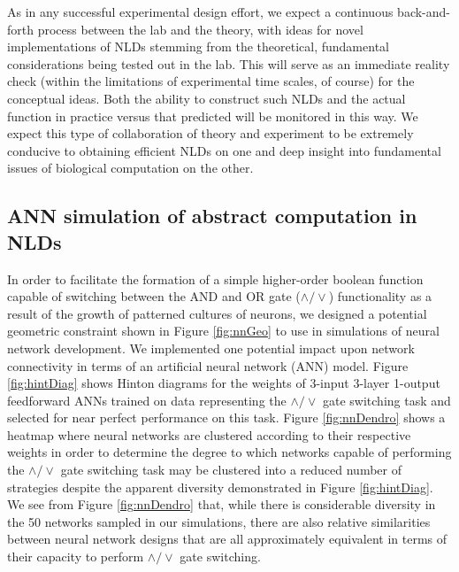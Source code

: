 As in any successful experimental design effort, we expect a continuous back-and-forth process between the lab and the theory, with ideas for novel implementations of NLDs stemming from the theoretical, fundamental considerations being tested out in the lab. This will serve as an immediate reality check (within the limitations of experimental time scales, of course) for the conceptual ideas. Both the ability to construct such NLDs and the actual function in practice versus that predicted will be monitored in this way. We expect this type of collaboration of theory and experiment to be extremely conducive to obtaining efficient NLDs on one and deep insight into fundamental issues of biological computation on the other. 


\subsection{ANN simulation of abstract computation in NLDs}
In order to facilitate the formation of a simple higher-order boolean function capable of switching between the AND and OR gate ($\wedge / \vee$) functionality as a result of the growth of patterned cultures of neurons, we designed a potential geometric constraint shown in Figure \ref{fig:nnGeo} to use in simulations of neural network development. We implemented one potential impact upon network connectivity in terms of an artificial neural network (ANN) model. Figure \ref{fig:hintDiag} shows Hinton diagrams for the weights of 3-input 3-layer 1-output feedforward ANNs trained on data representing the $\wedge / \vee$ gate switching task and selected for near perfect performance on this task. Figure \ref{fig:nnDendro} shows a heatmap where neural networks are clustered according to their respective weights in order to determine the degree to which networks capable of performing the $\wedge / \vee$ gate switching task may be clustered into a reduced number of strategies despite the apparent diversity demonstrated in Figure \ref{fig:hintDiag}. We see from Figure \ref{fig:nnDendro} that, while there is considerable diversity in the 50 networks sampled in our simulations, there are also relative similarities between neural network designs that are all approximately equivalent in terms of their capacity to perform $\wedge / \vee$ gate switching.

